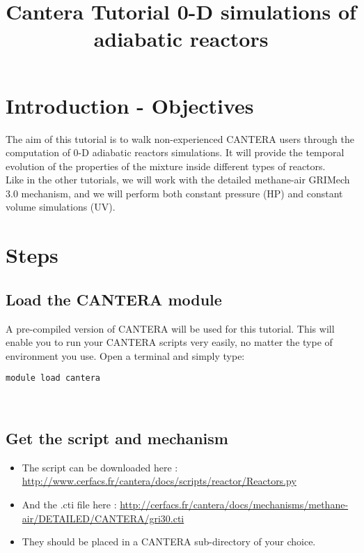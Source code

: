 \documentclass[a4paper,11pt]{article}
\title{
    \begin{minipage}\linewidth
        \centering\bfseries\sffamily
        Cantera Tutorial
        \vskip10pt
        \large 0-D simulations of adiabatic reactors
    \end{minipage}
}
\begin{document}
\maketitle

\section{Introduction - Objectives}
\bigskip

The aim of this tutorial is to walk non-experienced CANTERA users through the computation of 0-D adiabatic reactors simulations. It will provide the temporal evolution of the properties of the mixture inside different types of reactors. \\

Like in the other tutorials, we will work with the detailed methane-air GRIMech 3.0 mechanism, and we will perform both constant pressure (HP) and constant volume simulations (UV).

\section{Steps}
\bigskip

\subsection{Load the CANTERA module}
A pre-compiled version of CANTERA will be used for this tutorial. This will enable you to run your CANTERA scripts very easily, no matter the type of environment you use. Open a terminal and simply type: 
\begin{verbatim}
module load cantera
\end{verbatim}
\\

\subsection{Get the script and mechanism}
 \begin{itemize}
  \item  The script can be downloaded here : \url{http://www.cerfacs.fr/cantera/docs/scripts/reactor/Reactors.py}
  \item  And the .cti file here : \url{http://cerfacs.fr/cantera/docs/mechanisms/methane-air/DETAILED/CANTERA/gri30.cti}
  \item  They should be placed in a CANTERA sub-directory of your choice.
 \end{itemize}
\bigskip
\end{document}
